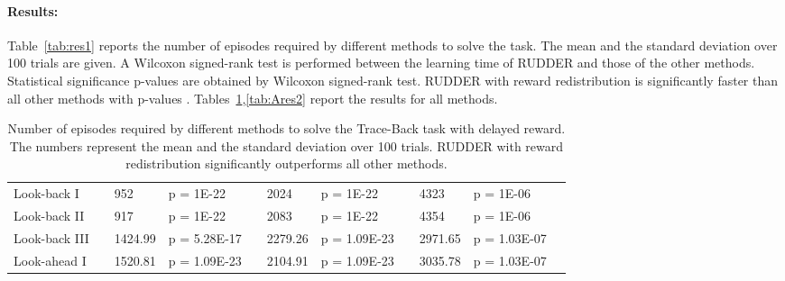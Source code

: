 \documentclass{article}
\begin{document}
\begin{appendices}
\paragraph{ Results: }
Table~\ref{tab:res1} reports the number of episodes required by different
methods to solve the task. 
The mean and the standard deviation over 100 trials are given.
A Wilcoxon signed-rank test is performed between the learning time of RUDDER 
and those of the other methods.
Statistical significance p-values are obtained by Wilcoxon signed-rank test.
RUDDER with reward redistribution is significantly faster than all other methods with p-values . 
Tables~\ref{tab:Ares1},\ref{tab:Ares2} report the results for all methods.


\newpage
\begin{landscape}
\begin{table}[htp]
\begin{center}
\caption{Number of episodes required by different 
 methods to solve the Trace-Back task with delayed reward. The numbers represent the  
 mean and the standard deviation over 100 trials.
 RUDDER with reward redistribution significantly outperforms all other methods.
}
\label{tab:Ares1}\begin{tabular}{*{1}{>{\raggedright}p{14em}}*{1}{>{\columncolor{mColor1}\raggedleft}p{4em}}*{1}{>{\columncolor{mColor1}\raggedleft}p{5em}}*{1}{>{\columncolor{mColor1}\raggedright}p{5em}}*{1}{>{\raggedleft}p{4em}}*{1}{>{\raggedleft}p{5em}}*{1}{>{\raggedright}p{5em}}*{1}{>{\columncolor{mColor1}\raggedleft}p{4em}}*{1}{>{\columncolor{mColor1}\raggedleft}p{5em}}*{1}{>{\columncolor{mColor1}\raggedright}p{5em}}*{1}{>{\raggedright}p{0.01em}}}
\toprule[1pt]
\addlinespace[2pt]
{\bf Method} &\multicolumn{3}{c}{\bf Delay 6} &\multicolumn{3}{c}{\bf Delay 8} &\multicolumn{3}{c}{\bf Delay 10} &\\
\toprule[1pt]
Look-back I & 6074 & {\small  952} & {\small p = 1E-22} & 13112 & {\small  2024} & {\small p = 1E-22} & 21715 & {\small  4323} & {\small p = 1E-06} &  \\
Look-back II & 4584 & {\small  917} & {\small p = 1E-22} & 9897 & {\small  2083} & {\small p = 1E-22} & 15973 & {\small  4354} & {\small p = 1E-06} &  \\
Look-back III & 4036.48 & {\small  1424.99} & {\small p = 5.28E-17} & 7812.72 & {\small  2279.26} & {\small p = 1.09E-23} & 10982.40 & {\small  2971.65} & {\small p = 1.03E-07} &  \\
Look-ahead I & 14469.10 & {\small  1520.81} & {\small p = 1.09E-23} & 28559.32 & {\small  2104.91} & {\small p = 1.09E-23} & 46650.20 & {\small  3035.78} & {\small p = 1.03E-07} &  \\

\end{tabular}
\end{center}
\end{table}
\end{landscape}
\end{appendices}
\end{document}
